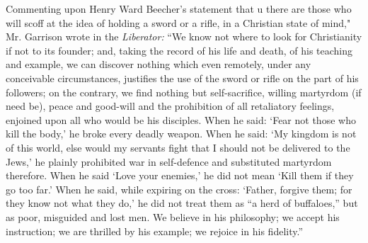 \documentclass{book}
\begin{document}
Commenting upon Henry Ward Beecher’s statement that u there are those who will scoff at the idea of holding a sword or a rifle, in a Christian state of mind," Mr. Garrison wrote in the \emph{Liberator:} “We know not where to look for Christianity if not to its founder; and, taking the record of his life and death, of his teaching and example, we can discover nothing which even remotely, under any conceivable circumstances, justifies the use of the sword or rifle on the part of his followers; on the contrary, we find nothing but self-sacrifice, willing martyrdom (if need be), peace and good-will and the prohibition of all retaliatory feelings, enjoined upon all who would be his disciples. When he said: ‘Fear not those who kill the body,’ he broke every deadly weapon. When he said: ‘My kingdom is not of this world, else would my servants fight that I should not be delivered to the Jews,’ he plainly prohibited war in self-defence and substituted martyrdom therefore. When he said ‘Love your enemies,’ he did not mean ‘Kill them if they go too far.’ When he said, while expiring on the cross: ‘Father, forgive them; for they know not what they do,’ he did not treat them as “a herd of buffaloes,” but as poor, misguided and lost men. We believe in his philosophy; we accept his instruction; we are thrilled by his example; we rejoice in his fidelity.”\footnotemark[9]
\end{document}
